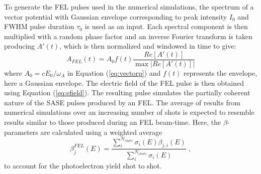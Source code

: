 To generate the FEL pulses used in the numerical simulations, the spectrum of a vector potential with Gaussian envelope corresponding to peak intensity $I_0$ and FWHM pulse duration $\tau_0$ is used as an input. Each spectral component is then multiplied with a random phase factor and an inverse Fourier transform is taken producing $A'(t)$, which is then normalized and windowed in time to give:
\begin{equation}
    A_{FEL}(t) = A_0 f(t)\frac{Re\left[A'(t)\right]}{\max|Re\left[A'(t)\right]|}
\end{equation}
where $A_0=c E_0/\omega_A$ in Equation (\ref{eq:vectorp}) and $f(t)$ represents the envelope, here a Gaussian envelope. The electric field of the FEL pulse is then obtained using Equation (\ref{eq:efield}). The resulting pulse simulates the partially coherent nature of the SASE pulses produced by an FEL. 
The average of results from numerical simulations over an increasing number of shots is expected to resemble results similar to those produced during an FEL beam-time. Here, the $\beta$-parameters are calculated using a weighted average
% 
\begin{equation}
\beta_j^{FEL}(E) 
= 
\frac{\sum_i^{N_{shots}}  \sigma_i(E) \beta_{j,i}(E)}
{\sum_i^{N_{shots}}\sigma_i(E)}\; ,
    \label{eq:FEL_beta}
\end{equation}
% 
to account for the photoelectron yield shot to shot.

